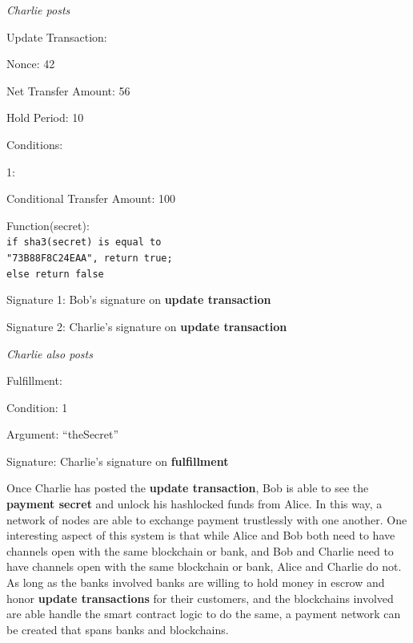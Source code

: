 \documentclass[a4paper]{article}
\newcommand{\bgls}[1]{\textbf{\gls{#1}}}
\newcommand{\bglspl}[1]{\textbf{\glspl{#1}}}
\newenvironment{mydescription}
{\begin{description}
\setlength{\itemsep}{5pt}
  \setlength{\parskip}{0pt}
  \setlength{\labelsep}{5pt}
}{
\end{description}}
\begin{document}
\begin{mdframed}[style=message]{\emph{Charlie posts}}
\begin{mydescription}
\item[Update Transaction:] \hfill
\begin{mydescription}
  \item[Nonce:] 42
  \item[Net Transfer Amount:] 56
  \item[Hold Period:] 10
  \item[Conditions:] \hfill
  \begin{mydescription}
    \item[1:] \hfill
    \begin{mydescription}
      \item[Conditional Transfer Amount:] 100
      \item[Function(secret):] \texttt{\\ if sha3(secret) is equal to\\ "73B88F8C24EAA", return true;\\ else return false}
    \end{mydescription}
  \end{mydescription}
\end{mydescription}
\item[Signature 1:] Bob's signature on \bgls{update transaction}
\item[Signature 2:] Charlie's signature on \bgls{update transaction}
\end{mydescription}
\end{mdframed}

\begin{mdframed}[style=message]{\emph{Charlie also posts}}
\begin{mydescription}
\item[Fulfillment:] \hfill
\begin{mydescription}
  \item[Condition:] 1
  \item[Argument:] ``theSecret''
\end{mydescription}
\item[Signature:] Charlie's signature on \bgls{fulfillment}
\end{mydescription}
\end{mdframed}

Once Charlie has posted the \bgls{update transaction}, Bob is able to see the \bgls{payment secret} and unlock his hashlocked funds from Alice. In this way, a network of nodes are able to exchange payment trustlessly with one another. One interesting aspect of this system is that while Alice and Bob both need to have channels open with the same blockchain or bank, and Bob and Charlie need to have channels open with the same blockchain or bank, Alice and Charlie do not. As long as the banks involved banks are willing to hold money in escrow and honor \bglspl{update transaction} for their customers, and the blockchains involved are able handle the smart contract logic to do the same, a payment network can be created that spans banks and blockchains.
\end{document}
